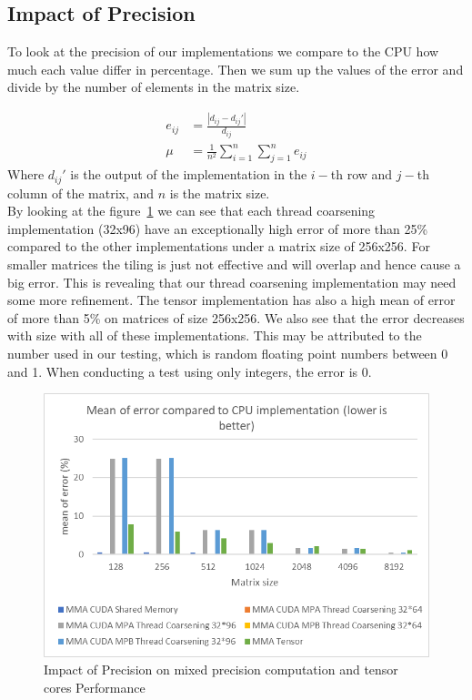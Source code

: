 \documentclass[conference]{IEEEtran}
\begin{document}
  
  \subsection{Impact of Precision}\label{sec:impact-precision}
  
  To look at the precision of our implementations we compare to the CPU how much each value differ in percentage.
  Then we sum up the values of the error and divide by the number of elements in the matrix size.

  \begin{align*}
    e_{ij} &= \frac{|d_{ij}-d_{ij}'|}{d_{ij}} \\
    \mu &= \frac{1}{n^2} \sum_{i=1}^n\sum_{j=1}^n e_{ij}
    \end{align*}
    Where $d_{ij}'$ is the output of the implementation in the $i-$th row and $j-$th column of the matrix,
    and $n$ is the matrix size.\\

  By looking at the figure~\ref{fig:precision-impact} we can see that each thread coarsening implementation (32x96)
  have an exceptionally high error of more than 25\% compared to the other implementations under a matrix size of 256x256.
  For smaller matrices the tiling is just not effective and will overlap and hence cause a big error. This is revealing that 
  our thread coarsening implementation may need some more refinement. The tensor implementation has also a high mean of error of
  more than 5\% on matrices of size 256x256.
  We also see that the error decreases with size with all of these implementations.
  This may be attributed to the number used in our testing, which is random floating point numbers between 0 and 1. 
  When conducting a test using only integers, the error is 0.
  \begin{figure}[htbp]
    \centering
    \includegraphics[scale=0.6]{figures/Mean of error compared to CPU3.png}
    \caption{Impact of Precision on mixed precision computation and tensor cores Performance}
    \label{fig:precision-impact}
  \end{figure}
\end{document}
